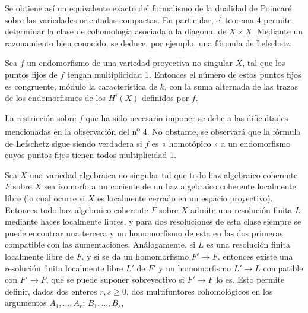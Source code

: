 Se obtiene así un equivalente exacto del formalismo de la dualidad de Poincaré
sobre las variedades orientadas compactas. En particular, el teorema 4 permite
determinar la clase de cohomología asociada a la diagonal de $X\times X$. Mediante
un razonamiento bien conocido, se deduce, por ejemplo, una fórmula de Lefschetz:

 Sea $f$ un endomorfismo de una variedad proyectiva no
singular $X$, tal que los puntos fijos de $f$ tengan multiplicidad 1.
Entonces el número de estos puntos fijos es congruente, módulo la característica de
$k$, con la suma alternada de las trazas de los endomorfismos de los $H^{i}(X)$ definidos
por $f$.

La restricción sobre $f$ que ha sido necesario imponer se debe a las dificultades mencionadas en
la observación del n\textsuperscript{o} 4. No obstante, se observará que la fórmula de
Lefschetz sigue siendo verdadera si $f$ es « homotópico » a un endomorfismo cuyos
puntos fijos tienen todos multiplicidad 1.


Sea $X$ una variedad algebraica no singular tal que todo haz
algebraico coherente $F$ sobre $X$ sea isomorfo a un cociente de un haz
algebraico coherente localmente libre (lo cual ocurre si $X$ es localmente
cerrado en un espacio proyectivo). Entonces todo haz algebraico coherente $F$ sobre
$X$ admite una resolución finita $L$ mediante haces localmente libres, y para
dos resoluciones de esta clase siempre se puede encontrar una tercera y un
homomorfismo de esta en las dos primeras compatible con las
aumentaciones. Análogamente, si $L$ es una resolución finita localmente libre de
$F$, y si se da un homomorfismo $F'\longrightarrow F$, entonces existe
una resolución finita localmente libre $L'$ de $F'$ y un homomorfismo
$L'\longrightarrow L$ compatible con $F'\longrightarrow F$, que se puede
suponer sobreyectivo si $F'\longrightarrow F$ lo es. Esto permite definir, dados
dos enteros $r,s\geq0$, dos multifuntores cohomológicos en los
argumentos $A_1,\ldots,A_r$; $B_1,\ldots,B_s$,

